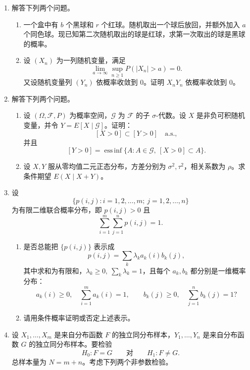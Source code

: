 \documentclass[UTF8,12pt]{ctexart}
\begin{document}
\begin{enumerate}[label=\textbf{\arabic*.},leftmargin=2.2em]
\item 解答下列两个问题。
\begin{enumerate}[label=\textbf{\arabic*)},leftmargin=2.4em]
\item 一个盒中有 \(b\) 个黑球和 \(r\) 个红球。随机取出一个球后放回，并额外加入 \(a\) 个同色球。现已知第二次随机取出的球是红球，求第一次取出的球是黑球的概率。
\item 设 \((X_n)\) 为一列随机变量，满足
\[
\lim_{a\to\infty}\sup_{n\ge1}P(|X_n|>a)=0.
\]
又设随机变量列 \((Y_n)\) 依概率收敛到 \(0\)。证明 \(X_nY_n\) 依概率收敛到 \(0\)。
\end{enumerate}

\item 解答下列两个问题。
\begin{enumerate}[label=\textbf{\arabic*)},leftmargin=2.4em]
\item 设 \((\Omega,\mathcal F,P)\) 为概率空间，\(\mathcal G\) 为 \(\mathcal F\) 的子 \(\sigma\)-代数。设 \(X\) 是非负可积随机变量，并令 \(Y=E[X\mid\mathcal G]\)。证明：
\[
[X>0]\subset [Y>0]\quad \text{a.s.},
\]
并且
\[
[Y>0]=\operatorname*{ess\,inf}\{A:A\in\mathcal G,\ [X>0]\subset A\}.
\]
\item 设 \(X,Y\) 服从零均值二元正态分布，方差分别为 \(\sigma^2,\tau^2\)，相关系数为 \(\rho\)。求条件期望 \(E(X\mid X+Y)\)。
\end{enumerate}

\item 设
\[
\{p(i,j):i=1,2,\ldots,m;\ j=1,2,\ldots,n\}
\]
为有限二维联合概率分布，即 \(p(i,j)>0\) 且
\[
\sum_{i=1}^m\sum_{j=1}^n p(i,j)=1.
\]
\begin{enumerate}[label=\textbf{(\roman*)},leftmargin=2.4em]
\item 是否总能把 \(\{p(i,j)\}\) 表示成
\[
p(i,j)=\sum_k\lambda_k a_k(i)b_k(j),
\]
其中求和为有限和，\(\lambda_k\ge0,\ \sum_k\lambda_k=1\)，且每个 \(a_k,b_k\) 都分别是一维概率分布：
\[
a_k(i)\ge0,\quad \sum_{i=1}^m a_k(i)=1,\qquad
b_k(j)\ge0,\quad \sum_{j=1}^n b_k(j)=1?
\]
\item 请用条件概率证明或否定上述表示。
\end{enumerate}

\item 设 \(X_1,\ldots,X_m\) 是来自分布函数 \(F\) 的独立同分布样本，\(Y_1,\ldots,Y_n\) 是来自分布函数 \(G\) 的独立同分布样本。要检验
\[
H_0:F=G\qquad \text{对}\qquad H_1:F\ne G.
\]
总样本量为 \(N=m+n\)。考虑下列两个非参数检验。


\end{enumerate}
\end{document}
